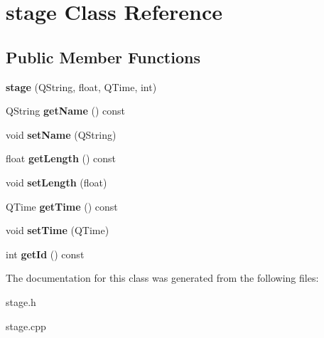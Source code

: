 \hypertarget{classstage}{}\section{stage Class Reference}
\label{classstage}
\subsection*{Public Member Functions}
\begin{DoxyCompactItemize}
\item 
\hypertarget{classstage_ade7007cfb7d4668e970b91c7c113b622}{}\label{classstage_ade7007cfb7d4668e970b91c7c113b622} 
{\bfseries stage} (Q\+String, float, Q\+Time, int)
\item 
\hypertarget{classstage_abe5315b20cf10aa622a29fc2063f1135}{}\label{classstage_abe5315b20cf10aa622a29fc2063f1135} 
Q\+String {\bfseries get\+Name} () const
\item 
\hypertarget{classstage_a9317565c15e58922bc38b7254d00c9b3}{}\label{classstage_a9317565c15e58922bc38b7254d00c9b3} 
void {\bfseries set\+Name} (Q\+String)
\item 
\hypertarget{classstage_adde52511308b9e3b08faaaaa1c9d8607}{}\label{classstage_adde52511308b9e3b08faaaaa1c9d8607} 
float {\bfseries get\+Length} () const
\item 
\hypertarget{classstage_a0b298a3eb0be3eff6d26c4bd769597ad}{}\label{classstage_a0b298a3eb0be3eff6d26c4bd769597ad} 
void {\bfseries set\+Length} (float)
\item 
\hypertarget{classstage_a4eec9a2cd8216b276c6f7f9ee6b1b702}{}\label{classstage_a4eec9a2cd8216b276c6f7f9ee6b1b702} 
Q\+Time {\bfseries get\+Time} () const
\item 
\hypertarget{classstage_aae2add83f27cf81d5921c7e19409b84f}{}\label{classstage_aae2add83f27cf81d5921c7e19409b84f} 
void {\bfseries set\+Time} (Q\+Time)
\item 
\hypertarget{classstage_ad63f04d22f5873a42bd8b69c67be3fa1}{}\label{classstage_ad63f04d22f5873a42bd8b69c67be3fa1} 
int {\bfseries get\+Id} () const
\end{DoxyCompactItemize}


The documentation for this class was generated from the following files\+:\begin{DoxyCompactItemize}
\item 
stage.\+h\item 
stage.\+cpp\end{DoxyCompactItemize}
